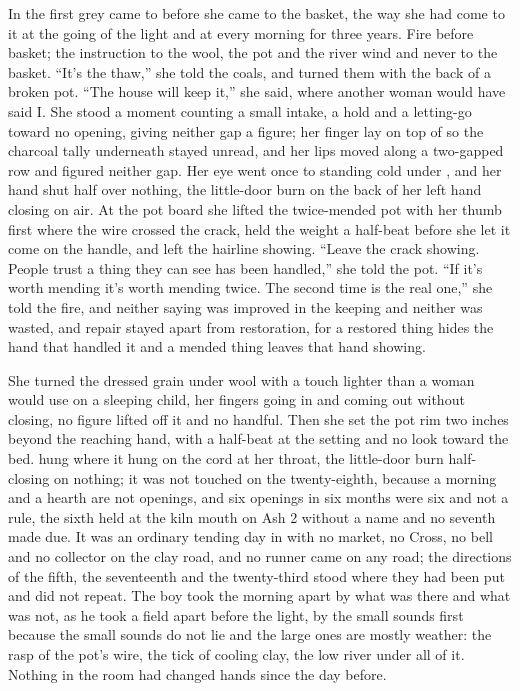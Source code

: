 \scenebreak

In the first grey  came to  before she came to the basket, the way she had come to it at the going of the light and at every morning for three years. Fire before basket; the instruction to the wool, the pot and the river wind and never to the basket. “It's the thaw,” she told the coals, and turned them with the back of a broken pot. “The house will keep it,” she said, where another woman would have said I. She stood a moment counting a small intake, a hold and a letting-go toward no opening, giving neither gap a figure; her finger lay on top of  so the charcoal tally underneath stayed unread, and her lips moved along a two-gapped row and figured neither gap. Her eye went once to  standing cold under , and her hand shut half over nothing, the little-door burn on the back of her left hand closing on air. At the pot board she lifted the twice-mended pot with her thumb first where the wire crossed the crack, held the weight a half-beat before she let it come on the handle, and left the hairline showing. “Leave the crack showing. People trust a thing they can see has been handled,” she told the pot. “If it's worth mending it's worth mending twice. The second time is the real one,” she told the fire, and neither saying was improved in the keeping and neither was wasted, and repair stayed apart from restoration, for a restored thing hides the hand that handled it and a mended thing leaves that hand showing.

She turned the dressed grain under wool with a touch lighter than a woman would use on a sleeping child, her fingers going in and coming out without closing, no figure lifted off it and no handful. Then she set the pot rim two inches beyond the reaching hand, with a half-beat at the setting and no look toward the bed.  hung where it hung on the cord at her throat, the little-door burn half-closing on nothing; it was not touched on the twenty-eighth, because a morning and a hearth are not openings, and six openings in six months were six and not a rule, the sixth held at the kiln mouth on Ash 2 without a name and no seventh made due. It was an ordinary tending day in  with no market, no Cross, no bell and no collector on the clay road, and no runner came on any road; the directions of the fifth, the seventeenth and the twenty-third stood where they had been put and did not repeat. The boy took the morning apart by what was there and what was not, as he took a field apart before the light, by the small sounds first because the small sounds do not lie and the large ones are mostly weather: the rasp of the pot's wire, the tick of cooling clay, the low river under all of it. Nothing in the room had changed hands since the day before.

